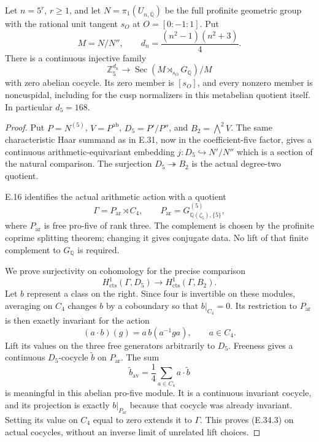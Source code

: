 \begin{theorem}
\label{E-five-metabelian}
Let $n=5^r$, $r\ge1$, and let
$N=\pi_1(U_{n,\overline{\mathbb Q}})$ be the full
profinite geometric group with the rational unit
tangent $s_O$ at $O=[0:-1:1]$. Put
\[
 M=N/N'',\qquad d_n=\frac{(n^2-1)(n^2+3)}4.
\]
There is a continuous injective family
\[
 \mathbb Z_5^{d_n}\longrightarrow
 \operatorname{Sec}(M\rtimes_{s_O}G_{\mathbb Q})/M
 \tag{E.34.1}
\]
with zero abelian cocycle. Its zero member is
$[s_O]$, and every nonzero member is noncuspidal,
including for the cusp normalizers in this
metabelian quotient itself. In particular
$d_5=168$.
\end{theorem}
\begin{proof}
Put $P=N^{(5)}$, $V=P^{\mathrm{ab}}$,
$D_5=P'/P''$, and $B_2=\bigwedge^2V$.
The same characteristic Haar summand as in
E.31, now in the coefficient-five factor,
gives a continuous arithmetic-equivariant
embedding
$j:D_5\hookrightarrow N'/N''$ which is a
section of the natural comparison. The
surjection $D_5\twoheadrightarrow B_2$ is
the actual degree-two quotient.

E.16 identifies the actual arithmetic action
with a quotient
\[
 \Gamma=P_{\mathrm{ar}}\rtimes C_4,
 \qquad
 P_{\mathrm{ar}}=G_{\mathbb Q(\zeta_5),\{5\}}^{(5)},
 \tag{E.34.2}
\]
where $P_{\mathrm{ar}}$ is free pro-five of
rank three. The complement is chosen by
the profinite coprime splitting theorem;
changing it gives conjugate data. No lift
of that finite complement to $G_{\mathbb Q}$
is required.

We prove surjectivity on cohomology for the
precise comparison
\[
 H^1_{\mathrm{cts}}(\Gamma,D_5)
       \longrightarrow H^1_{\mathrm{cts}}(\Gamma,B_2).
 \tag{E.34.3}
\]
Let $b$ represent a class on the right.
Since four is invertible on these modules,
averaging on $C_4$ changes $b$ by a
coboundary so that $b|_{C_4}=0$.
Its restriction to $P_{\mathrm{ar}}$ is
then exactly invariant for the action
\[
 (a\cdot b)(g)=a\,b(a^{-1}ga),\qquad a\in C_4.
 \tag{E.34.4}
\]
Lift its values on the three free
generators arbitrarily to $D_5$.
Freeness gives a continuous $D_5$-cocycle
$\widetilde b$ on $P_{\mathrm{ar}}$.
The sum
\[
 \widetilde b_{\mathrm{av}}
       =\frac14\sum_{a\in C_4}a\cdot\widetilde b
 \tag{E.34.5}
\]
is meaningful in this abelian pro-five
module. It is a continuous invariant
cocycle, and its projection is exactly
$b|_{P_{\mathrm{ar}}}$ because that
cocycle was already invariant. Setting
its value on $C_4$ equal to zero extends
it to $\Gamma$. This proves (E.34.3)
on actual cocycles, without an inverse
limit of unrelated lift choices.


\end{proof}
